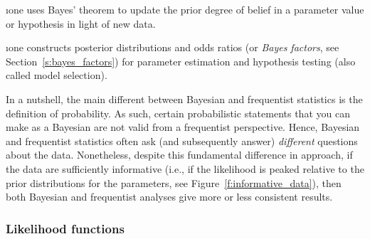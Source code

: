 \i one uses Bayes' theorem to update the prior degree 
of belief in a parameter value or hypothesis in light 
of new data.

\i one constructs posterior distributions and odds 
ratios (or {\em Bayes factors}, see Section~\ref{s:bayes_factors}) 
for parameter estimation and hypothesis testing (also 
called model selection).

\ei
\noindent
In a nutshell, the main different between Bayesian and 
frequentist statistics is the definition of probability.
As such, certain probabilistic statements that you can
make as a Bayesian are not valid from a frequentist perspective.
Hence, Bayesian and frequentist statistics often ask 
(and subsequently answer) {\em different} questions 
about the data.
Nonetheless, despite this fundamental difference in approach,
if the data are sufficiently informative (i.e., if the 
likelihood is peaked relative to the prior distributions 
for the parameters, see Figure~\ref{f:informative_data}), 
then both Bayesian and frequentist analyses give more or 
less consistent results.

\subsubsection{Likelihood functions}
\label{s:likelihood}

